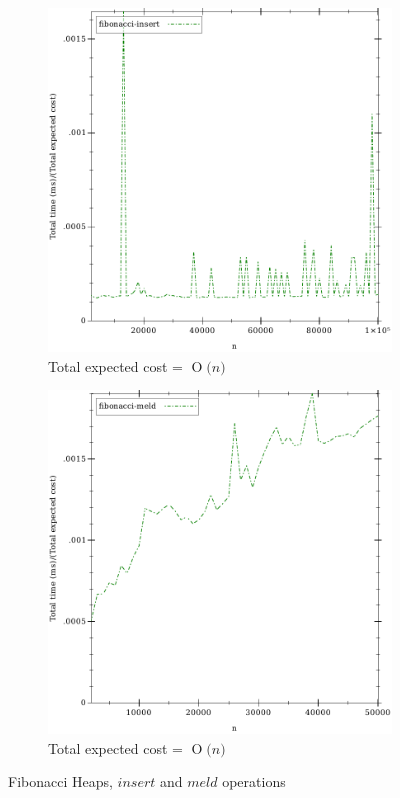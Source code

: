 \documentclass{llncs}
\newcommand{\BigO}[1]{\ensuremath{\operatorname{O}\bigl(#1\bigr)}}
\begin{document}
\begin{figure}
	\begin{subfigure}{0.5\textwidth}
		\centering
		\includegraphics[width=0.8\linewidth]{FIG/fi_insert.pdf}
		\caption{Total expected cost = \BigO{n}}
		\label{fig:fi_insert}
	\end{subfigure}%
	\begin{subfigure}{0.5\textwidth}
		\centering
		\includegraphics[width=0.8\linewidth]{FIG/fi_meld.pdf}
		\caption{Total expected cost = \BigO{n}}
		\label{fig:fi_meld}
	\end{subfigure}
	\caption{Fibonacci Heaps, $insert$ and $meld$ operations}
	\label{fig:fi_insert_meld}
\end{figure}
\end{document}
